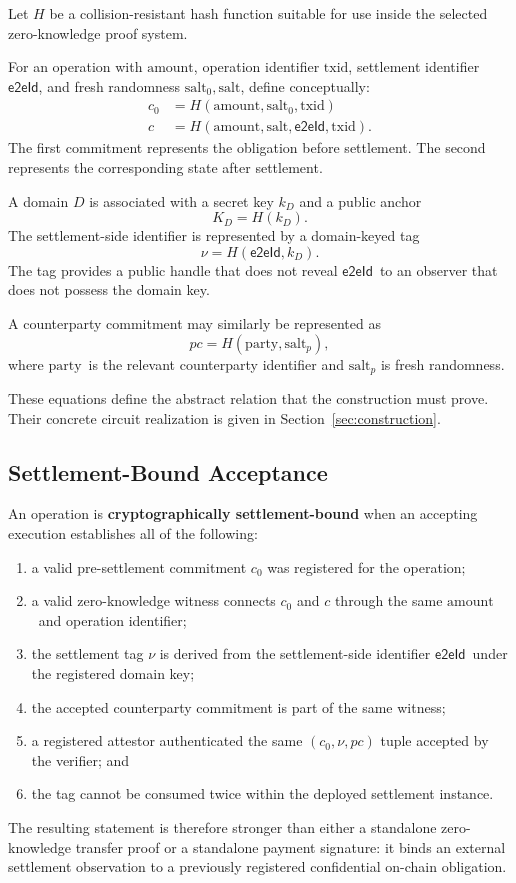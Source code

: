 \documentclass[10pt,twocolumn]{article}
\newcommand{\eeid}{\ensuremath{\mathsf{e2eId}}}
\newcommand{\amount}{\ensuremath{\text{amount}}}
\newcommand{\txid}{\ensuremath{\text{txid}}}
\newcommand{\party}{\ensuremath{\text{party}}}
\newcommand{\salt}{\ensuremath{\text{salt}}}
\newcommand{\pc}{\ensuremath{\mathit{pc}}}
\begin{document}
Let $H$ be a collision-resistant hash function suitable for use inside
the selected zero-knowledge proof system.

For an operation with \amount, operation identifier \txid, settlement
identifier \eeid, and fresh randomness $\salt_0,\salt$, define
conceptually:
\[
\begin{aligned}
c_0 &= H(\amount,\salt_0,\txid) \\
c &= H(\amount,\salt,\eeid,\txid).
\end{aligned}
\]
The first commitment represents the obligation before settlement. The
second represents the corresponding state after settlement.

A domain $D$ is associated with a secret key $k_D$ and a public anchor
\[
K_D = H(k_D).
\]
The settlement-side identifier is represented by a domain-keyed tag
\[
\nu = H(\eeid,k_D).
\]
The tag provides a public handle that does not reveal \eeid\ to an
observer that does not possess the domain key.

A counterparty commitment may similarly be represented as
\[
\pc = H(\party,\salt_p),
\]
where \party\ is the relevant counterparty identifier and $\salt_p$ is
fresh randomness.

These equations define the abstract relation that the construction must
prove. Their concrete circuit realization is given in
Section~\ref{sec:construction}.

\subsection{Settlement-Bound Acceptance}

An operation is \textbf{cryptographically settlement-bound} when an
accepting execution establishes all of the following:
\begin{enumerate}
\item a valid pre-settlement commitment $c_0$ was registered for the
  operation;
\item a valid zero-knowledge witness connects $c_0$ and $c$ through the
  same \amount\ and operation identifier;
\item the settlement tag $\nu$ is derived from the settlement-side
  identifier \eeid\ under the registered domain key;
\item the accepted counterparty commitment is part of the same witness;
\item a registered attestor authenticated the same $(c_0,\nu,\pc)$ tuple
  accepted by the verifier; and
\item the tag cannot be consumed twice within the deployed settlement
  instance.
\end{enumerate}
The resulting statement is therefore stronger than either a standalone
zero-knowledge transfer proof or a standalone payment signature: it binds
an external settlement observation to a previously registered
confidential on-chain obligation.
\end{document}
